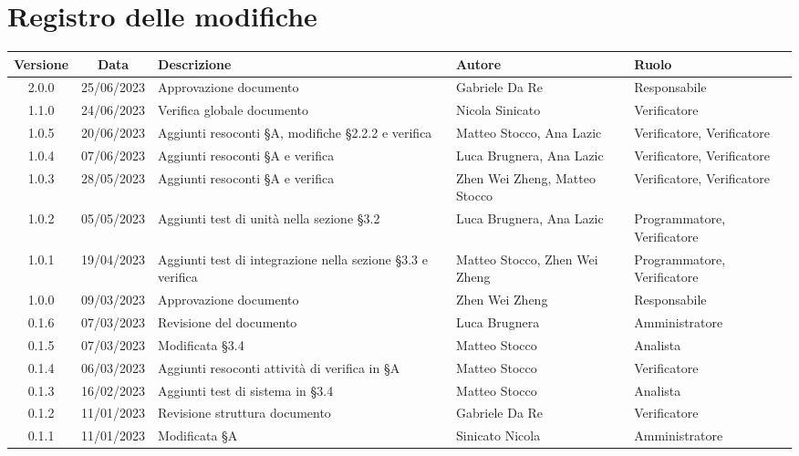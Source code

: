 \section*{Registro delle modifiche}
\begin{center}
\setlength\extrarowheight{5pt}
\renewcommand\tabularxcolumn[1]{>{\Centering}m{#1}}
\begin{tabularx}{\textwidth}{| c | c | X | X | X |} 
	\hline
	\rowcolor{white}
	\textbf{Versione} & \textbf{Data} & \textbf{Descrizione} & \textbf{Autore} & \textbf{Ruolo}\\
	\hline
	2.0.0 & 25/06/2023 & Approvazione documento & Gabriele Da Re & Responsabile \\
	\hline
	1.1.0 & 24/06/2023 & Verifica globale documento & Nicola Sinicato & Verificatore \\
	\hline
	1.0.5 & 20/06/2023 & Aggiunti resoconti §A, modifiche §2.2.2 e verifica & Matteo Stocco, Ana Lazic & Verificatore, Verificatore \\
	\hline
	1.0.4 & 07/06/2023 & Aggiunti resoconti §A e verifica & Luca Brugnera, Ana Lazic & Verificatore, Verificatore \\
	\hline
	1.0.3 & 28/05/2023 & Aggiunti resoconti §A e verifica & Zhen Wei Zheng, Matteo Stocco & Verificatore, Verificatore \\
	\hline
	1.0.2 & 05/05/2023 & Aggiunti test di unità nella sezione §3.2 & Luca Brugnera, Ana Lazic & Programmatore, Verificatore \\
	\hline
	1.0.1 & 19/04/2023 & Aggiunti test di integrazione nella sezione §3.3 e verifica & Matteo Stocco, Zhen Wei Zheng & Programmatore, Verificatore \\
	\hline
	1.0.0 & 09/03/2023 & Approvazione documento & Zhen Wei Zheng & Responsabile \\
	\hline
	0.1.6 & 07/03/2023 & Revisione del documento & Luca Brugnera & Amministratore \\
	\hline
	0.1.5 & 07/03/2023 & Modificata §3.4 & Matteo Stocco & Analista \\
	\hline
	0.1.4 & 06/03/2023 & Aggiunti resoconti attività di verifica in §A & Matteo Stocco & Verificatore \\
    \hline
    0.1.3 & 16/02/2023 & Aggiunti test di sistema in §3.4 & Matteo Stocco & Analista \\
    \hline
	0.1.2 & 11/01/2023 & Revisione struttura documento & Gabriele Da Re & Verificatore \\
	\hline
	0.1.1 & 11/01/2023 & Modificata §A & Sinicato Nicola &Amministratore \\

\end{tabularx}
\end{center}
